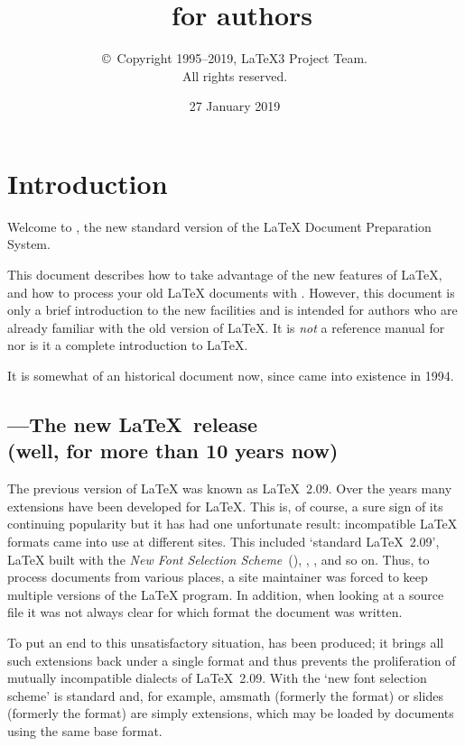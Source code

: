 \documentclass{ltxguide}[2001/05/28]
\title{\LaTeXe~for authors}
\author{\copyright~Copyright 1995--2019, \LaTeX3 Project Team.\\
   All rights reserved.}
\date{27 January 2019}
\begin{document}
\maketitle

\tableofcontents

\section{Introduction}

Welcome to \LaTeXe, the new standard version of the \LaTeX{} Document
Preparation System.

This document describes how to take advantage of the new features of
\LaTeX, and how to process your old \LaTeX{} documents with
\LaTeXe. However, this document is only a brief introduction to the
new facilities and is intended for authors who are already familiar
with the old version of \LaTeX{}.  It is \emph{not} a reference manual
for \LaTeXe{} nor is it a complete introduction to \LaTeX.

It is somewhat of an historical document now, since \LaTeXe{} came into
existence in 1994.

\subsection[\LaTeXe---The new \LaTeX~release]
  {\LaTeXe---The new \LaTeX~release\\ (well, for more than 10 years now)}

The previous version of \LaTeX{} was known as \LaTeX~2.09.  Over the
years many extensions have been developed for \LaTeX.  This is, of
course, a sure sign of its continuing popularity but it has had one
unfortunate result: incompatible \LaTeX{} formats came into use at
different sites.  This included `standard \LaTeX~2.09', \LaTeX{} built
with the \emph{New Font Selection Scheme}~(\NFSS), \SLiTeX, \AmSLaTeX,
and so on.  Thus, to process documents from various places, a site
maintainer was forced to keep multiple versions of the \LaTeX{}
program.  In addition, when looking at a source file it was not always
clear for which format the document was written.

To put an end to this unsatisfactory situation, \LaTeXe{} has been
produced; it brings all such extensions back under a single format and
thus prevents the proliferation of mutually incompatible dialects of
\LaTeX~2.09.  With \LaTeXe{} the `new font selection scheme' is
standard and, for example, \textsf{amsmath} (formerly the \AmSLaTeX{}
format) or \textsf{slides} (formerly the \SLiTeX{} format) are simply
extensions, which may be loaded by documents using the same base format.
\end{document}
